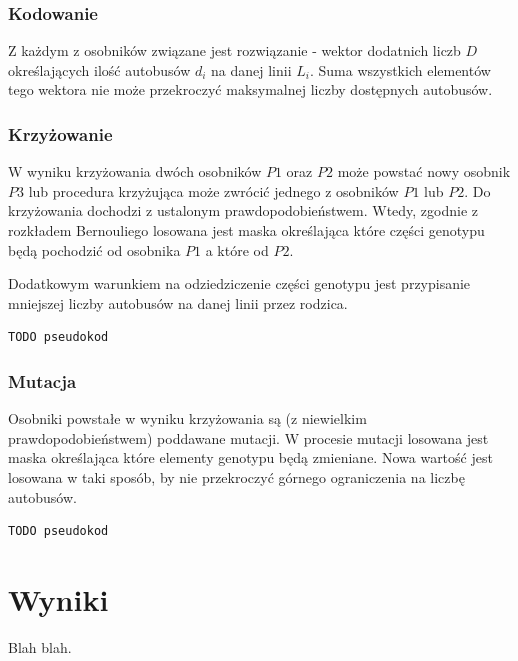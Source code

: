\documentclass[polish,12pt]{aghthesis}
\begin{document}
\subsubsection{Kodowanie}
Z każdym z osobników związane jest rozwiązanie - wektor dodatnich liczb $D$ określających ilość autobusów $d_i$ na danej linii $L_i$. Suma wszystkich elementów tego wektora nie może przekroczyć maksymalnej liczby dostępnych autobusów.

\subsubsection{Krzyżowanie}
W wyniku krzyżowania dwóch osobników $P1$ oraz $P2$ może powstać nowy osobnik $P3$ lub procedura krzyżująca może zwrócić jednego z osobników $P1$ lub $P2$. Do krzyżowania dochodzi z ustalonym prawdopodobieństwem. Wtedy, zgodnie z rozkładem Bernouliego losowana jest maska określająca które części genotypu będą pochodzić od osobnika $P1$ a które od $P2$.

Dodatkowym warunkiem na odziedziczenie części genotypu jest przypisanie mniejszej liczby autobusów na danej linii przez rodzica.

\begin{lstlisting}[language=Python]
TODO pseudokod
\end{lstlisting}

\subsubsection{Mutacja}
Osobniki powstałe w wyniku krzyżowania są (z niewielkim prawdopodobieństwem) poddawane mutacji. W procesie mutacji losowana jest maska określająca które elementy genotypu będą zmieniane. Nowa wartość jest losowana w taki sposób, by nie przekroczyć górnego ograniczenia na liczbę autobusów.

\begin{lstlisting}[language=Python]
TODO pseudokod
\end{lstlisting}

\newpage




\section{Wyniki}
Blah blah.

\newpage



\nocite{bib-transit-oriented}


\newpage

\listoffigures
\newpage
\end{document}
